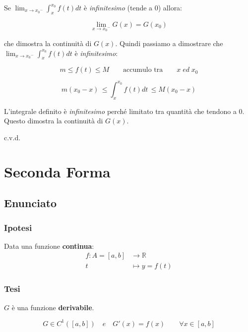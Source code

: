 \documentclass[../dimostrazioni]{subfiles}
\begin{document}
                    Se \( \lim_{x \to {x_0}^{-}} \int_{x}^{x_0} f(t) dt \) è \emph{infinitesimo} (tende a 0) allora:

                    \[  \lim_{x \to {x_0}^{-}}G(x) = G(x_0) \]

                    che dimostra la continuità di \(G(x)\). Quindi passiamo a dimostrare che \( \lim_{x \to {x_0}^{-}} \int_{x}^{x_0} f(t) dt \) è \emph{infinitesimo}:

                    \[m \leqslant f(t) \leqslant M \qquad \text {accumulo tra} \qquad x \; ed \; x_0 \]

                    \[m(x_0-x) \, \leqslant \int_{x}^{x_0} f(t) dt \, \leqslant M(x_0-x) \]

                    L'integrale definito è \emph{infinitesimo} perché limitato tra quantità che tendono a 0. Questo dimostra la continuità di \(G(x)\).

                    c.v.d.
            
            \section*{Seconda Forma}

                \subsection*{Enunciato}

                    \subsubsection*{Ipotesi}

                        Data una funzione \textbf{continua}:
                        \begin{align*}
                            f : A = [a, b] &\longrightarrow \mathbb{R}\\
                            t &\longmapsto y = f(t) 
                        \end{align*}

                    \subsubsection*{Tesi}
                    
                        \(G\) è una funzione \textbf{derivabile}.

                        \[G \in C^{1}([a, b]) \quad e \quad G'(x) = f(x) \qquad \forall x \in [a,b] \]
        
\end{document}
